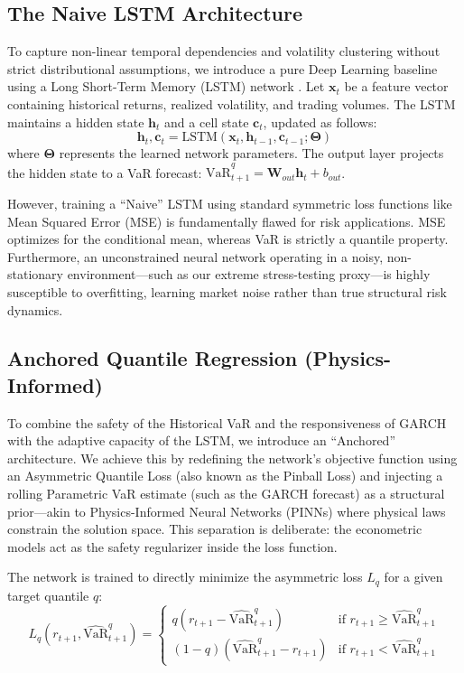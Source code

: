 \subsection{The Naive LSTM Architecture}
To capture non-linear temporal dependencies and volatility clustering without strict distributional assumptions, we introduce a pure Deep Learning baseline using a Long Short-Term Memory (LSTM) network \cite{hochreiter1997long}. Let $\bm{x}_t$ be a feature vector containing historical returns, realized volatility, and trading volumes. The LSTM maintains a hidden state $\bm{h}_t$ and a cell state $\bm{c}_t$, updated as follows:
\begin{equation}
    \bm{h}_t, \bm{c}_t = \text{LSTM}(\bm{x}_t, \bm{h}_{t-1}, \bm{c}_{t-1}; \bm{\Theta})
\end{equation}
where $\bm{\Theta}$ represents the learned network parameters. The output layer projects the hidden state to a VaR forecast: $\widehat{\text{VaR}}_{t+1}^q = \bm{W}_{out} \bm{h}_t + b_{out}$.

However, training a ``Naive'' LSTM using standard symmetric loss functions like Mean Squared Error (MSE) is fundamentally flawed for risk applications. MSE optimizes for the conditional mean, whereas VaR is strictly a quantile property. Furthermore, an unconstrained neural network operating in a noisy, non-stationary environment---such as our extreme stress-testing proxy---is highly susceptible to overfitting, learning market noise rather than true structural risk dynamics.

\subsection{Anchored Quantile Regression (Physics-Informed)}
To combine the safety of the Historical VaR and the responsiveness of GARCH with the adaptive capacity of the LSTM, we introduce an ``Anchored'' architecture. We achieve this by redefining the network's objective function using an Asymmetric Quantile Loss (also known as the Pinball Loss) \cite{koenker1978regression} and injecting a rolling Parametric VaR estimate (such as the GARCH forecast) as a structural prior---akin to Physics-Informed Neural Networks (PINNs) where physical laws constrain the solution space. This separation is deliberate: the econometric models act as the safety regularizer inside the loss function.

The network is trained to directly minimize the asymmetric loss $L_q$ for a given target quantile $q$:
\begin{equation}
    L_q(r_{t+1}, \widehat{\text{VaR}}_{t+1}^q) = 
    \begin{cases} 
      q (r_{t+1} - \widehat{\text{VaR}}_{t+1}^q) & \text{if } r_{t+1} \geq \widehat{\text{VaR}}_{t+1}^q \\
      (1 - q) (\widehat{\text{VaR}}_{t+1}^q - r_{t+1}) & \text{if } r_{t+1} < \widehat{\text{VaR}}_{t+1}^q
    \end{cases}
\end{equation}

